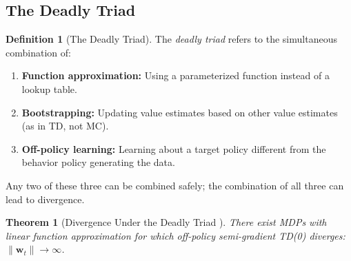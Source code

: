 \documentclass[11pt,a4paper]{article}
\theoremstyle{definition}
\newtheorem{definition}{Definition}[section]
\theoremstyle{plain}
\newtheorem{theorem}{Theorem}[section]
\theoremstyle{remark}
\begin{document}
\subsection{The Deadly Triad}
\label{subsec:deadly_triad}

\begin{definition}[The Deadly Triad]
\label{def:deadly_triad}
The \emph{deadly triad} refers to the simultaneous combination of:
\begin{enumerate}[nosep]
    \item \textbf{Function approximation:} Using a parameterized function instead of a lookup table.
    \item \textbf{Bootstrapping:} Updating value estimates based on other value estimates (as in TD, not MC).
    \item \textbf{Off-policy learning:} Learning about a target policy different from the behavior policy generating the data.
\end{enumerate}
Any two of these three can be combined safely; the combination of all three can lead to divergence.
\end{definition}

\begin{theorem}[Divergence Under the Deadly Triad {\cite{baird1995,tsitsiklis1997}}]
\label{thm:divergence}
There exist MDPs with linear function approximation for which off-policy semi-gradient TD(0) diverges: $\|\bm{w}_t\| \to \infty$.
\end{theorem}
\end{document}
